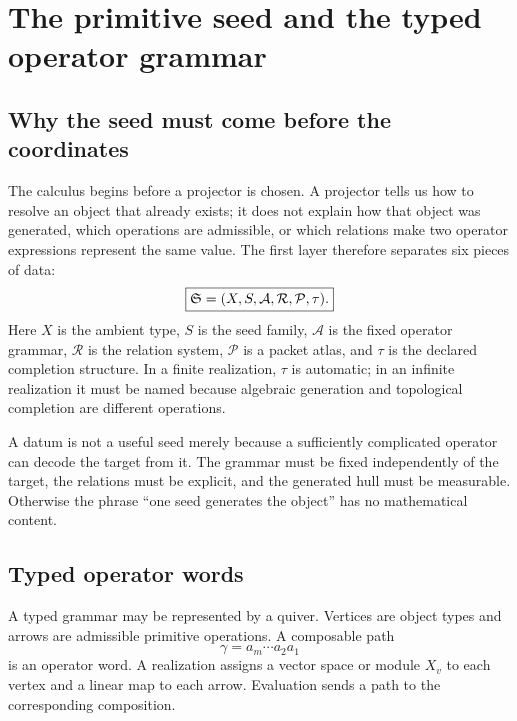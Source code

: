 \chapter{The primitive seed and the typed operator grammar}\label{ch:seed-first}

\section{Why the seed must come before the coordinates}
The calculus begins before a projector is chosen.  A projector tells us how to resolve an object that already exists; it does not explain how that object was generated, which operations are admissible, or which relations make two operator expressions represent the same value.  The first layer therefore separates six pieces of data:
\[
\boxed{
\mathfrak S=(X,S,\mathcal A,\mathcal R,\mathcal P,\tau).
}
\]
Here $X$ is the ambient type, $S$ is the seed family, $\mathcal A$ is the fixed operator grammar, $\mathcal R$ is the relation system, $\mathcal P$ is a packet atlas, and $\tau$ is the declared completion structure.  In a finite realization, $\tau$ is automatic; in an infinite realization it must be named because algebraic generation and topological completion are different operations.


\begin{boundarybox}
A datum is not a useful seed merely because a sufficiently complicated operator can decode the target from it.  The grammar must be fixed independently of the target, the relations must be explicit, and the generated hull must be measurable.  Otherwise the phrase ``one seed generates the object'' has no mathematical content.
\end{boundarybox}

\section{Typed operator words}
A typed grammar may be represented by a quiver.  Vertices are object types and arrows are admissible primitive operations.  A composable path
\[
\gamma=a_m\cdots a_2a_1
\]
is an operator word.  A realization assigns a vector space or module $X_v$ to each vertex and a linear map to each arrow.  Evaluation sends a path to the corresponding composition.

